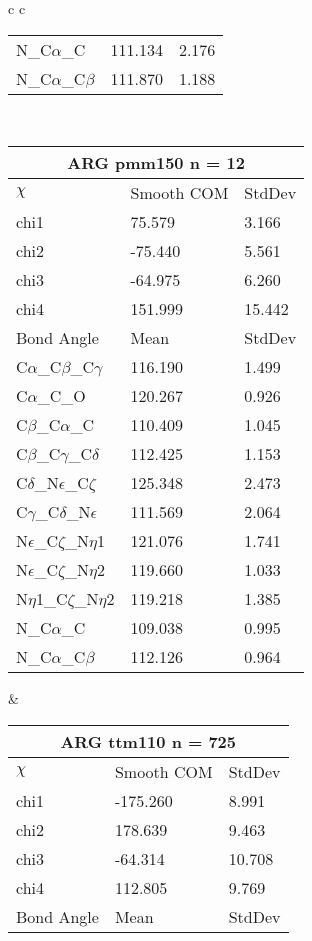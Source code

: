 \begin{longtable}{ c c }
\begin{tabular}{ l l l }
  N\_C$\alpha$\_C & 111.134 & 2.176\\
  N\_C$\alpha$\_C$\beta$ & 111.870 & 1.188\\
  \bottomrule
  \end{tabular}
  \\
  \begin{tabular}{ l l l }
  \toprule
  \multicolumn{3}{c}{ARG \textbf{pmm150} n = 12} \\ \toprule
  $\chi$       & Smooth COM & StdDev \\ \midrule
  chi1 & 75.579 & 3.166 \\ 
  chi2 & -75.440 & 5.561 \\ 
  chi3 & -64.975 & 6.260 \\ 
  chi4 & 151.999 & 15.442 \\ \midrule
  Bond Angle   & Mean     & StdDev \\ \midrule
  C$\alpha$\_C$\beta$\_C$\gamma$ & 116.190 & 1.499\\
  C$\alpha$\_C\_O & 120.267 & 0.926\\
  C$\beta$\_C$\alpha$\_C & 110.409 & 1.045\\
  C$\beta$\_C$\gamma$\_C$\delta$ & 112.425 & 1.153\\
  C$\delta$\_N$\epsilon$\_C$\zeta$ & 125.348 & 2.473\\
  C$\gamma$\_C$\delta$\_N$\epsilon$ & 111.569 & 2.064\\
  N$\epsilon$\_C$\zeta$\_N$\eta$1 & 121.076 & 1.741\\
  N$\epsilon$\_C$\zeta$\_N$\eta$2 & 119.660 & 1.033\\
  N$\eta$1\_C$\zeta$\_N$\eta$2 & 119.218 & 1.385\\
  N\_C$\alpha$\_C & 109.038 & 0.995\\
  N\_C$\alpha$\_C$\beta$ & 112.126 & 0.964\\
  \bottomrule
  \end{tabular}
  &
  \begin{tabular}{ l l l }
  \toprule
  \multicolumn{3}{c}{ARG \textbf{ttm110} n = 725} \\ \toprule
  $\chi$       & Smooth COM & StdDev \\ \midrule
  chi1 & -175.260 & 8.991 \\ 
  chi2 & 178.639 & 9.463 \\ 
  chi3 & -64.314 & 10.708 \\ 
  chi4 & 112.805 & 9.769 \\ \midrule
  Bond Angle   & Mean     & StdDev \\ \midrule

\end{tabular}
\end{longtable}
